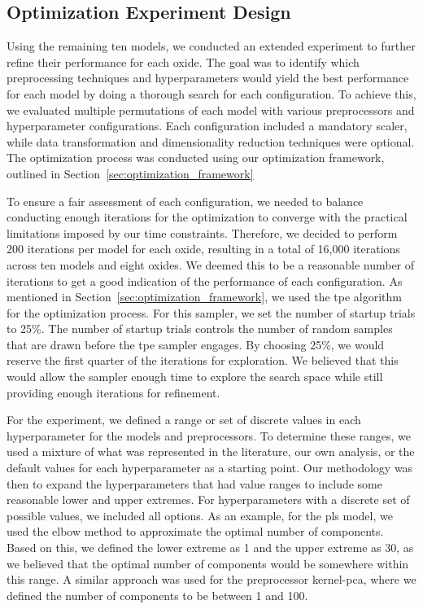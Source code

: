 \subsection{Optimization Experiment Design}\label{subsec:optimization_experiment_design}
Using the remaining ten models, we conducted an extended experiment to further refine their performance for each oxide. 
The goal was to identify which preprocessing techniques and hyperparameters would yield the best performance for each model by doing a thorough search for each configuration. 
To achieve this, we evaluated multiple permutations of each model with various preprocessors and hyperparameter configurations. 
Each configuration included a mandatory scaler, while data transformation and dimensionality reduction techniques were optional. 
The optimization process was conducted using our optimization framework, outlined in Section~\ref{sec:optimization_framework}

To ensure a fair assessment of each configuration, we needed to balance conducting enough iterations for the optimization to converge with the practical limitations imposed by our time constraints.
Therefore, we decided to perform 200 iterations per model for each oxide, resulting in a total of 16,000 iterations across ten models and eight oxides.
We deemed this to be a reasonable number of iterations to get a good indication of the performance of each configuration.
As mentioned in Section~\ref{sec:optimization_framework}, we used the \gls{tpe} algorithm for the optimization process.
For this sampler, we set the number of startup trials to 25\%.
The number of startup trials controls the number of random samples that are drawn before the \gls{tpe} sampler engages. 
By choosing 25\%, we would reserve the first quarter of the iterations for exploration.
We believed that this would allow the sampler enough time to explore the search space while still providing enough iterations for refinement. 

For the experiment, we defined a range or set of discrete values in each hyperparameter for the models and preprocessors. 
To determine these ranges, we used a mixture of what was represented in the literature, our own analysis, or the default values for each hyperparameter as a starting point. 
Our methodology was then to expand the hyperparameters that had value ranges to include some reasonable lower and upper extremes. 
For hyperparameters with a discrete set of possible values, we included all options. 
As an example, for the \gls{pls} model, we used the elbow method to approximate the optimal number of components. 
Based on this, we defined the lower extreme as 1 and the upper extreme as 30, as we believed that the optimal number of components would be somewhere within this range. 
A similar approach was used for the preprocessor \gls{kernel-pca}, where we defined the number of components to be between 1 and 100.

